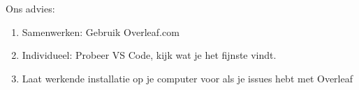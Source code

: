 \begin{frame}[fragile]
\begin{columns}
\begin{column}{0.4\textwidth}
{            \bigskip
            
            Ons advies:
            \begin{enumerate}[label={\arabic*)}]
                \item Samenwerken: Gebruik Overleaf.com
                \item Individueel: Probeer VS Code, kijk wat je het fijnste vindt.
                \item Laat werkende installatie op je computer voor als je issues hebt met Overleaf
            \end{enumerate}
            }
        \end{column}
    \end{columns}

    \relax
    


\end{frame}

